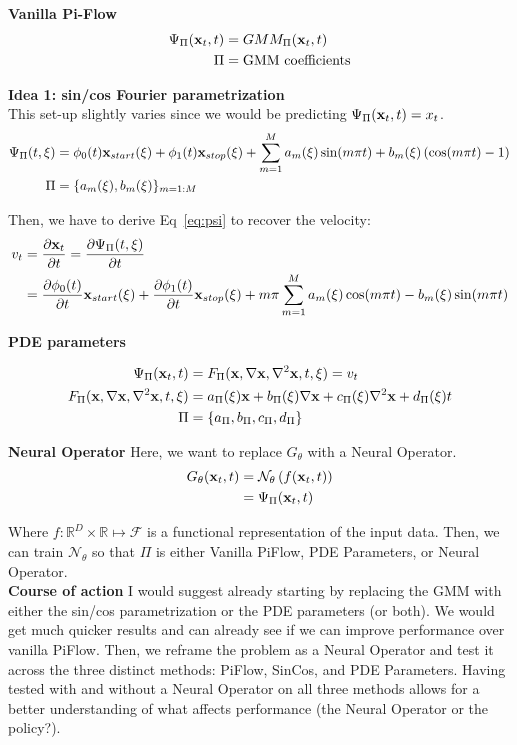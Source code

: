 \noindent \textbf{Vanilla Pi-Flow}
\begin{align*}
    \Psi_{\Pi}(\mathbf{x}_t, t) &= GMM_{\Pi}(\mathbf{x}_t, t) \\
    \Pi &= \mbox{GMM coefficients}
\end{align*}

\noindent \textbf{Idea 1: sin/cos Fourier parametrization} \\

\noindent This set-up slightly varies since we would be predicting $\Psi_{\Pi}(\mathbf{x}_t, t) = x_t$.
\begin{align*}  
    \Psi_{\Pi}(t, \xi) &= \phi_0(t)\mathbf{x}_{start}(\xi) + \phi_1(t)\mathbf{x}_{stop}(\xi) + \sum_{m = 1}^M a_m(\xi)\sin(m\pi t) + b_m(\xi)\left(\cos(m\pi t) - 1\right) \label{eq:psi} \\
    \Pi & = \{a_m(\xi), b_m(\xi)\}_{m = 1:M}
\end{align*}

\noindent Then, we have to derive Eq~\ref{eq:psi} to recover the velocity:
\begin{align*}
    v_t &= \frac{\partial \mathbf{x}_t}{\partial t} = \frac{\partial \Psi_{\Pi}(t, \xi)}{\partial t} \\
    & = \frac{\partial \phi_0(t)}{\partial t}\mathbf{x}_{start}(\xi) + \frac{\partial \phi_1(t)}{\partial t}\mathbf{x}_{stop}(\xi) + m\pi\sum_{m = 1}^M a_m(\xi)\cos(m\pi t) - b_m(\xi)\sin(m\pi t) \\
\end{align*}

\noindent \textbf{PDE parameters}

\begin{align*}
    \Psi_{\Pi}(\mathbf{x}_t, t) &= F_{\Pi}(\mathbf{x}, \nabla \mathbf{x}, \nabla^2\mathbf{x}, t, \xi) = v_t\\
    F_{\Pi}(\mathbf{x}, \nabla \mathbf{x}, \nabla^2\mathbf{x}, t, \xi) & = a_{\Pi}(\xi)\mathbf{x} + b_{\Pi}(\xi)\nabla\mathbf{x} + c_{\Pi}(\xi)\nabla^2\mathbf{x} + d_\Pi(\xi) t\\
    \Pi &= \{a_{\Pi}, b_{\Pi}, c_{\Pi}, d_{\Pi} \}
\end{align*}

\noindent \textbf{Neural Operator}
Here, we want to replace $G_{\theta}$ with a Neural Operator.
\begin{align*}
    G_{\theta}(\mathbf{x}_t, t) & = \mathcal{N}_{\theta}\left(f(\mathbf{x}_t, t)\right) \\
    & = \Psi_{\Pi}(\mathbf{x}_t, t)
\end{align*}

\noindent Where $f : \mathbb{R}^{D} \times \mathbb{R} \mapsto \mathcal{F}$ is a functional representation of the input data. Then, we can train $\mathcal{N}_{\theta}$ so that $\Pi$ is either Vanilla PiFlow, PDE Parameters, or Neural Operator. \\

\noindent \textbf{Course of action} I would suggest already starting by replacing the GMM with either the sin/cos parametrization or the PDE parameters (or both). We would get much quicker results and can already see if we can improve performance over vanilla PiFlow. Then, we reframe the problem as a Neural Operator and test it across the three distinct methods: PiFlow, SinCos, and PDE Parameters. Having tested with and without a Neural Operator on all three methods allows for a better understanding of what affects performance (the Neural Operator or the policy?).